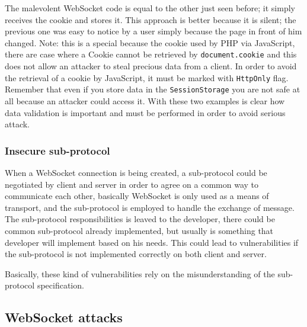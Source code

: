 	
	The malevolent WebSocket code is equal to the other just seen before; it simply receives the cookie and stores it.\newline
	This approach is better because it is silent; the previous one was easy to notice by a user simply because the page in front of him changed.\newline
	Note: this is a special because the cookie used by PHP via JavaScript, there are case where a Cookie cannot be retrieved by \texttt{document.cookie} and this does not allow an attacker to steal precious data from a client.
	In order to avoid the retrieval of a cookie by JavaScript, it must be marked with \texttt{HttpOnly} flag.
	Remember that even if you store data in the \texttt{SessionStorage} you are not safe at all because an attacker could access it.
	With these two examples is clear how data validation is important and must be performed in order to avoid serious attack.
	
	\subsubsection{Insecure sub-protocol}
	When a WebSocket connection is being created, a sub-protocol could be negotiated by client and server in order to agree on a common way to communicate each other, basically WebSocket is only used as a means of transport, and the sub-protocol is employed to handle the exchange of message.\newline
	The sub-protocol responsibilities is leaved to the developer, there could be common sub-protocol already implemented, but usually is something that developer will implement based on his needs.\newline
	This could lead to vulnerabilities if the sub-protocol is not implemented correctly on both client and server.\newline
	
	Basically, these kind of vulnerabilities rely on the misunderstanding of the sub-protocol specification.
	
	
	
	\subsection{WebSocket attacks}